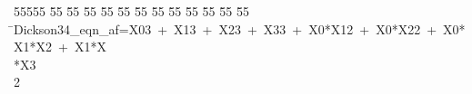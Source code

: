 %
%
\begin{tabbing}
55555 \= 55 \= 55 \= 55 \= 55 \= 55 \= 55 \= 55 \= 55 \= 55 \= 55 \= 55 \= 55 \= \>Dickson34\_eqn\_af=X03\ +\ X13\ +\ X23\ +\ X33\ +\ X0*X12\ +\ X0*X22\ +\ X0*X1*X2\ +\ X1*X\\[0pt]
*X3\\[0pt]
2\>\end{tabbing}
